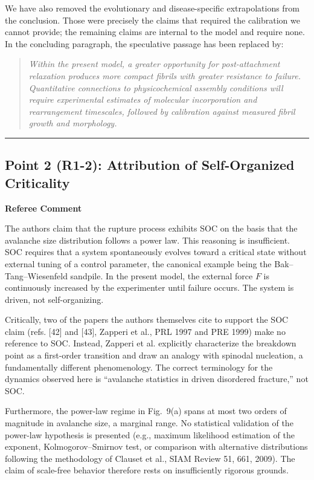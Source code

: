 \documentclass[11pt]{article}
\newenvironment{refereecomment}
  {%
    \par
    \begingroup
    \color{commentgray}
    \itshape
    \setlength{\leftskip}{1.4em}
    \setlength{\rightskip}{1.4em}
  }
  {%
    \par
    \endgroup
  }
\newcommand{\refereelabel}{%
  \par\smallskip
  {\color{commentgray}\bfseries Referee Comment}\par
}
\newcommand{\pointseparator}{%
  \par\bigskip
  {\color{rulegray}\hrule}
  \par\bigskip
}
\begin{document}
We have also removed the evolutionary and disease-specific extrapolations from
the conclusion. Those were precisely the claims that required the calibration we
cannot provide; the remaining claims are internal to the model and require none.
In the concluding paragraph, the speculative passage has been replaced by:

\begin{quotation}\itshape
Within the present model, a greater opportunity for post-attachment relaxation
produces more compact fibrils with greater resistance to failure. Quantitative
connections to physicochemical assembly conditions will require experimental
estimates of molecular incorporation and rearrangement timescales, followed by
calibration against measured fibril growth and morphology.
\end{quotation}


\pointseparator


\subsection*{Point 2 (R1-2): Attribution of Self-Organized Criticality}

\refereelabel
\begin{refereecomment}
  The authors claim that the rupture process exhibits SOC on the basis that the
  avalanche size distribution follows a power law. This reasoning is
  insufficient. SOC requires that a system spontaneously evolves toward a
  critical state without external tuning of a control parameter, the canonical
  example being the Bak--Tang--Wiesenfeld sandpile. In the present model, the
  external force \(F\) is continuously increased by the experimenter until
  failure occurs. The system is driven, not self-organizing.
  
  Critically, two of the papers the authors themselves cite to support the SOC
  claim (refs. [42] and [43], Zapperi et al., PRL 1997 and PRE 1999) make no
  reference to SOC. Instead, Zapperi et al. explicitly characterize the breakdown
  point as a first-order transition and draw an analogy with spinodal nucleation,
  a fundamentally different phenomenology. The correct terminology for the
  dynamics observed here is ``avalanche statistics in driven disordered
  fracture,'' not SOC.
  
  Furthermore, the power-law regime in Fig.~9(a) spans at most two orders of
  magnitude in avalanche size, a marginal range. No statistical validation of
  the power-law hypothesis is presented (e.g., maximum likelihood estimation of
  the exponent, Kolmogorov--Smirnov test, or comparison with alternative
  distributions following the methodology of Clauset et al., SIAM Review 51,
  661, 2009). The claim of scale-free behavior therefore rests on insufficiently
  rigorous grounds.
\end{refereecomment}
\end{document}
